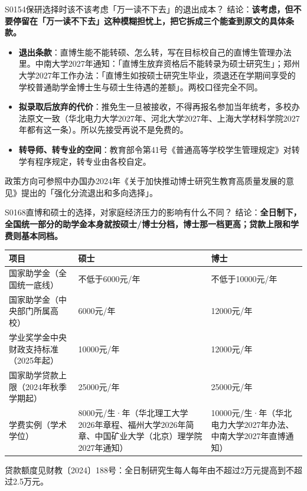 \begin{qa}{S0154}{保研选择时该不该考虑「万一读不下去」的退出成本？}
结论：\textbf{该考虑，但不要停留在「万一读不下去」这种模糊担忧上，把它拆成三个能查到原文的具体条款。}

\begin{itemize}
  \item \textbf{退出条款}：直博生能不能转硕、怎么转，写在目标校自己的直博生管理办法里。中南大学2027年通知：「直博生放弃资格后不能转录为硕士研究生」；郑州大学2027年工作办法：「直博生如按硕士研究生毕业，须退还在学期间享受的学校普通助学金博士生与硕士生待遇的差额」。两校口径完全不同。
  \item \textbf{拟录取后放弃的代价}：推免生一旦被接收，不得再报名参加当年统考，多校办法原文一致（华北电力大学2027年、河北大学2027年、上海大学材料学院2027年都有这一条）。所以先接受再说不是免费的。
  \item \textbf{转导师、转专业的空间}：教育部令第41号《普通高等学校学生管理规定》对转学有程序规定，转专业由各校自定。
\end{itemize}

政策方向可参照中办国办2024年《关于加快推动博士研究生教育高质量发展的意见》提出的「强化分流退出和多向选择」。
\end{qa}

\begin{qa}{S0168}{直博和硕士的选择，对家庭经济压力的影响有什么不同？}
结论：\textbf{全日制下，全国统一部分的助学金本身就按硕士/博士分档，博士那一档更高；贷款上限和学费则基本同档。}

\par\vspace{2pt}\nobreak\begin{center}\footnotesize
\begin{tabularx}{\textwidth}{>{\raggedright\arraybackslash}X>{\raggedright\arraybackslash}X>{\raggedright\arraybackslash}X}
\toprule
\textbf{项目} & \textbf{硕士} & \textbf{博士} \\ \midrule
国家助学金（全国统一底线） & 不低于6000元/年 & 不低于10000元/年 \\
国家助学金（中央部门所属高校） & 6000元/年 & 12000元/年 \\
学业奖学金中央财政支持标准（2025年起） & 10000元/年 & 12000元/年 \\
国家助学贷款上限（2024年秋季学期起） & 25000元/年 & 25000元/年 \\
学费实例（学术学位） & 8000元/生·年（华北理工大学2026年章程、福州大学2026年简章、中国矿业大学（北京）理学院2027年通知） & 10000元/生·年（华北电力大学2027年办法、中南大学2027年直博通知） \\
\bottomrule
\end{tabularx}
\end{center}\vspace{2pt}\par

贷款额度见财教〔2024〕188号：全日制研究生每人每年由不超过2万元提高到不超过2.5万元。
\end{qa}

